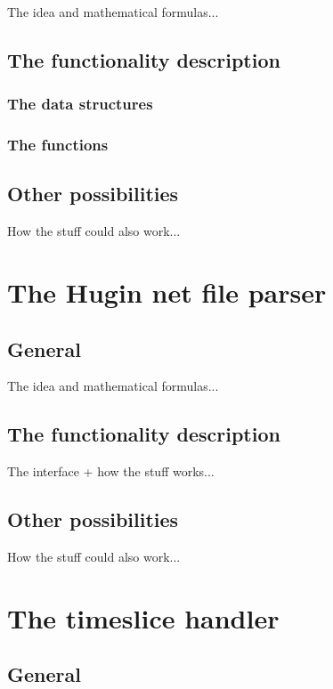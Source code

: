 \documentclass[12pt,a4paper]{report}
\begin{document}
The idea and mathematical formulas...

\subsection{The functionality description}
\subsubsection{The data structures}

\subsubsection{The functions}


\subsection{Other possibilities}

How the stuff could also work...


\newpage
\section{The Hugin net file parser}
\subsection{General}

The idea and mathematical formulas...

\subsection{The functionality description}

The interface + how the stuff works...

\subsection{Other possibilities}

How the stuff could also work...


\newpage
\section{The timeslice handler} %
\subsection{General}
\end{document}
